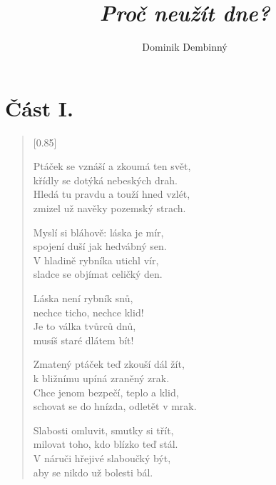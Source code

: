 \documentclass[12pt, a4paper]{article}
\title{\Huge\bfseries\itshape Proč neužít dne?}
\author{Dominik Dembinný} %
\date{}   %
\begin{document}
\maketitle
\thispagestyle{empty} 
\vspace{2em} %

\onehalfspacing

\section*{Část I.}

\begin{verse}[0.85\textwidth]

Ptáček se vznáší a zkoumá ten svět, \\
křídly se dotýká nebeských drah. \\
Hledá tu pravdu a touží hned vzlét, \\
zmizel už navěky pozemský strach.

\vspace{1em}

Myslí si bláhově: láska je mír, \\
spojení duší jak hedvábný sen. \\
V hladině rybníka utichl vír, \\
sladce se objímat celičký den. 

\vspace{1em}

Láska není rybník snů, \\
nechce ticho, nechce klid! \\
Je to válka tvůrců dnů, \\
musíš staré dlátem bít!

\vspace{1em}

Zmatený ptáček teď zkouší dál žít, \\
k bližnímu upíná zraněný zrak. \\
Chce jenom bezpečí, teplo a klid, \\
schovat se do hnízda, odletět v mrak.

\vspace{1em}
\newpage

Slabosti omluvit, smutky si třít, \\
milovat toho, kdo blízko teď stál. \\
V náruči hřejivé slaboučký být, \\
aby se nikdo už bolesti bál.


\end{verse}
\end{document}
